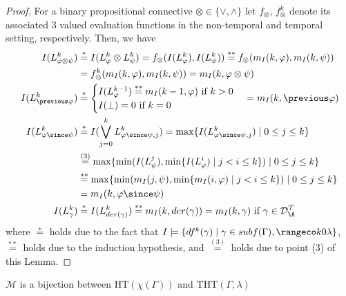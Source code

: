 \begin{proof}
  For a binary propositional connective
  $\otimes \in \{ \vee, \wedge\}$ let $f_{\otimes}$, $f_{\otimes}^k$
  denote its associated 3 valued evaluation functions in the
  non-temporal and temporal setting, respectively. Then, we have
  \begin{align*}
    I(L^k_{\varphi \otimes \psi}) &\stackrel{*}{=} I(L^k_{\varphi} \otimes L^k_{\psi})
    = f_{\otimes}(I(L^k_\varphi),I(L^k_\psi)) \stackrel{**}{=} f_{\otimes}(m_I(k,\varphi),m_I(k,\psi))  \\
    &= f_{\otimes}^k(m_I(k,\varphi),m_I(k,\psi)) = m_I(k,\varphi \otimes \psi)\\
    I(L^k_{\previous \varphi}) &\stackrel{*}{=}
      \begin{cases}
        I(L^{k-1}_\varphi) \stackrel{**}{=} m_I(k-1,\varphi) \text{ if } k > 0\\
        I(\bot) = 0 \text{ if } k = 0
      \end{cases} = m_I(k,\previous \varphi)\\
    I(L^k_{\varphi \since \psi}) &\stackrel{*}= I(\bigvee_{j=0}^{k} L^k_{\varphi \since \psi,j})
    = \max \{ I(L^k_{\varphi \since \psi,j}) \mid 0 \leq j \leq k \}\\
                                  &\stackrel{(3)}{=} \max \{\min (I(L^j_{\psi}), \min \{I(L^i_{\varphi}) \mid j<i \leq k\}) \mid 0 \leq j \leq k\} \\
                                  &\stackrel{**}{=} \max \{\min (m_I(j, \psi), \min \{m_I(i, \varphi) \mid j<i \leq k\}) \mid 0 \leq j \leq k\} \\
                                  &= m_I(k,\varphi \since \psi)\\
  I(L^k_{\gamma}) &\stackrel{*}{=} I(L^k_{der(\gamma)}) \stackrel{**}{=} m_I(k,der(\gamma)) = m_I(k,\gamma) \text{ if } \gamma \in \langdat
  \end{align*}
  where $\stackrel{*}=$ holds due to the fact that
  $I \models \{ df^k(\gamma) \mid \gamma \in subf(\Gamma), \kinlambda
  \}$, $\stackrel{**}=$ holds due to the induction hypothesis, and
  $\stackrel{(3)}{=}$ holds due to point (3) of this Lemma.
\end{proof}

\begin{theorem}\label{theorem:translation}
  $\mathcal{M}$ is a bijection between $\text{HT}(\chi(\Gamma))$ and
  $\text{THT}(\Gamma,\lambda)$
\end{theorem}

